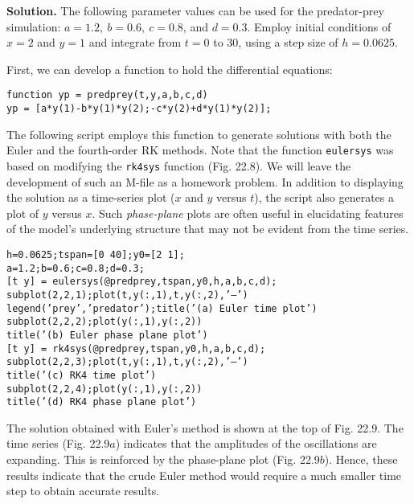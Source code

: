 \noindent\textbf{Solution.} The following parameter values can be used for the predator-prey simulation: $a = 1.2,\ b = 0.6,\ c = 0.8$, and $d = 0.3$. Employ initial conditions of $x = 2$ and $y = 1$ and integrate from $t = 0$ to 30, using a step size of $h = 0.0625$.

First, we can develop a function to hold the differential equations:\vspace{\smallskipamount}

\noindent\texttt{function yp = predprey(t,y,a,b,c,d)\\
yp = [a*y(1)-b*y(1)*y(2);-c*y(2)+d*y(1)*y(2)];}\vspace{\medskipamount}

The following script employs this function to generate solutions with both the Euler
and the fourth-order RK methods. Note that the function \texttt{eulersys} was based on modifying the \texttt{rk4sys} function (Fig. 22.8). We will leave the development of such an M-file as a
homework problem. In addition to displaying the solution as a time-series plot ($x$ and $y$
versus $t$), the script also generates a plot of $y$ versus $x$. Such \textit{phase-plane} plots are often
useful in elucidating features of the model's underlying structure that may not be evident
from the time series.\vspace{\medskipamount}

\noindent\texttt{h=0.0625;tspan=[0 40];y0=[2 1];\\
a=1.2;b=0.6;c=0.8;d=0.3;\\}
\noindent\texttt{[t y] = eulersys(@predprey,tspan,y0,h,a,b,c,d);\\}
\noindent\texttt{subplot(2,2,1);plot(t,y(:,1),t,y(:,2),'--')\\
legend('prey','predator');title('(a) Euler time plot')\\
subplot(2,2,2);plot(y(:,1),y(:,2))\\
title('(b) Euler phase plane plot')\\}
\noindent\texttt{[t y] = rk4sys(@predprey,tspan,y0,h,a,b,c,d);\\}
\noindent\texttt{subplot(2,2,3);plot(t,y(:,1),t,y(:,2),'--')\\
title('(c) RK4 time plot')\\
subplot(2,2,4);plot(y(:,1),y(:,2))\\
title('(d) RK4 phase plane plot')}\vspace{\smallskipamount}

The solution obtained with Euler's method is shown at the top of Fig. 22.9. The time
series (Fig. 22.9$a$) indicates that the amplitudes of the oscillations are expanding. This is
reinforced by the phase-plane plot (Fig. 22.9$b$). Hence, these results indicate that the crude
Euler method would require a much smaller time step to obtain accurate results.

